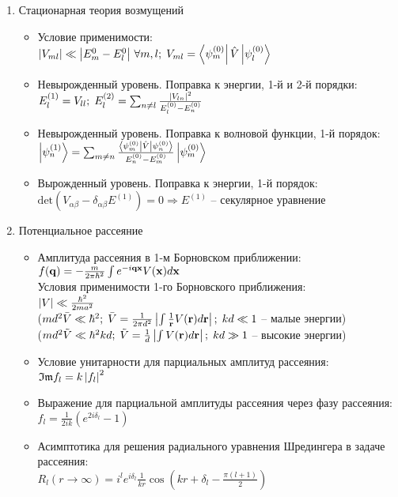 \begin{enumerate}[label=\textbf{\underline{\arabic*.}}]
\item Стационарная теория возмущений  \begin{itemize}
            \item Условие применимости: \\
            $ \abs{V_{ml}} \ll \abs{E_m^0 - E_l^0}\, \forall m,l;\; V_{ml}=\matrixel{\psi_m^{(0)}}{\hat{V}}{\psi_l^{(0)}} $
            \item Невырожденный уровень. Поправка к энергии, 1-й и 2-й порядки: \\
            $ E_l^{(1)} = V_{ll};\; E_l^{(2)} = \sum_{n \neq l} \frac{\left| V_{ln} \right|^2}{E_l^{(0)} - E_n^{(0)}} $
            \item Невырожденный уровень. Поправка к волновой функции, 1-й порядок: \\
            $ \ket{\psi_n^{(1)}} = \sum_{m \neq n} \frac{\matrixel{\psi_m^{(0)}}{\hat{V}}{\psi_n^{(0)}}}{E_n^{(0)} - E_m^{(0)}}\ket{\psi^{(0)}_m} $
            \item Вырожденный уровень. Поправка к энергии, 1-й порядок: \\
            $ \text{det}(V_{\alpha\beta} - \delta_{\alpha\beta}E^{(1)})=0 \Rightarrow E^{(1)} $ -- секулярное уравнение

        \end{itemize}
\item Потенциальное рассеяние  \begin{itemize}
            \item Амплитуда рассеяния в 1-м Борновском приближении: \\
            $ f(\mathbf{q}) = -\frac{m}{2\pi\hbar^2}\int e^{-i\mathbf{q}\mathbf{x}} V(\mathbf{x})d\mathbf{x} $ \\
            Условия применимости 1-го Борновского приближения: \\
            $\left| V \right| \ll \frac{\hbar^2}{2ma^2} $\\
            ($ md^2\bar{V} \ll \hbar^2;\; \bar{V} = \frac1{2\pi d^2} \left| \int \frac1{\mathbf{r}}V(\mathbf{r})d\mathbf{r} \right|;\; kd \ll 1 $ -- малые энергии) \\
            ($ md^2\tilde{V} \ll \hbar^2kd;\; \tilde{V} = \frac1{d} \left| \int V(\mathbf{r})d\mathbf{r} \right|;\; kd \gg 1 $ -- высокие энергии)
            \item Условие унитарности для парциальных амплитуд рассеяния: \\
            $ \mathfrak{Im}{f_l} = k \left| f_l \right|^2 $
            \item Выражение для парциальной амплитуды рассеяния через фазу рассеяния: \\
            $ f_l = \frac1{2ik}(e^{2i\delta_l} - 1) $
            \item Асимптотика для решения радиального уравнения Шредингера в задаче рассеяния: \\
            $ R_l(r \rightarrow \infty) = i^l e^{i\delta_l} \frac1{kr} \cos(kr+\delta_l - \frac{\pi(l+1)}{2}) $


\end{itemize}
\end{enumerate}
